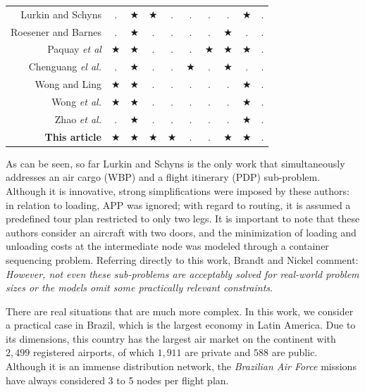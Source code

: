 \documentclass[preprint]{elsarticle}
\begin{document}
\begin{table}[H]
\begin{tabular}{r|cccc|ccccc}
		Lurkin and Schyns \cite{LurkinSchyns2015} & $.$ & $\bigstar$  & $\bigstar$ & $.$  & $.$ & $.$   & $.$  & $\bigstar$  &  $.$ \\
		Roesener and Barnes \cite{RoesenerBarnes2016}  & $.$ & $\bigstar$   & $.$ & $.$ & $.$ & $.$   & $\bigstar$  & $.$  &  $.$ \\
		Paquay {\it et al} \cite{PaquaySchynsLimbourg2016,PaquayLimbourgSchynsOliveira2018}  & $\bigstar$ & $\bigstar$ & $.$ & $.$ & $.$ & $\bigstar$ & $\bigstar$  & $\bigstar$ & $.$ \\
		Chenguang {\it el al.} \cite{YangLiuGao2018} & $.$ & $\bigstar$  & $.$  & $.$ & $\bigstar$  & $.$ & $\bigstar$ & $.$  & $.$ \\
		Wong and Ling \cite{wong2020} & $\bigstar$  & $\bigstar$  & $.$  & $.$   & $.$  & $.$ & $.$ & $\bigstar$  & $.$  \\
		Wong {\it et al.} \cite{eugene2021} & $\bigstar$ & $\bigstar$ & $.$  & $.$   & $.$ & $.$ & $.$ & $\bigstar$  & $.$  \\
		Zhao {\it et al.} \cite{zhao2021} & $.$ & $\bigstar$ & $.$  & $.$  & $.$ & $.$ & $.$  & $\bigstar$ &  $.$ \\
		{\bf This article}   & $\bigstar$ & $\bigstar$  & $\bigstar$& $\bigstar$ & $.$ & $.$ & $\bigstar$ & $\bigstar$   &  $.$  \\
		\bottomrule 
	\end{tabular}
	\normalsize 
\end{table}


As can be seen, so far Lurkin and Schyns \cite{LurkinSchyns2015} is the only work that simultaneously addresses an air cargo (WBP) and a flight itinerary (PDP) sub-problem. Although it is innovative, strong simplifications were imposed by these authors: in relation to loading, APP was ignored; with regard to routing, it is assumed a predefined tour plan restricted to only two legs. It is important to note that these authors consider an aircraft with two doors, and the minimization of loading and unloading costs at the intermediate node was modeled through a container sequencing problem. Referring directly to this work, Brandt and Nickel \cite[p. 409]{BrandtStefan2019} comment: {\it However, not even these sub-problems are acceptably solved for real-world problem sizes or the models omit some practically relevant constraints}. 

There are real situations that are much more complex. In this work, we consider a practical case in Brazil, which is the largest economy in Latin America. Due to its dimensions, this country has the largest air market on the continent with $2,499$\/ registered airports, of which $1,911$\/ are private and $588$\/ are public. Although it is an immense distribution network, the {\it Brazilian Air Force}\/ missions have always considered 3 to 5 nodes per flight plan.
\end{document}
